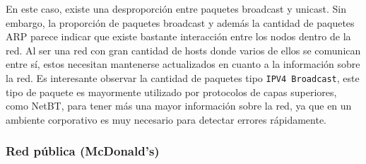 En este caso, existe una desproporción entre paquetes broadcast y unicast. Sin embargo, la proporción de paquetes broadcast y además la cantidad de paquetes ARP parece indicar que existe bastante interacción entre los nodos dentro de la red. Al ser una red con gran cantidad de hosts donde varios de ellos se comunican entre sí, estos necesitan mantenerse actualizados en cuanto a la información sobre la red. Es interesante observar la cantidad de paquetes tipo \texttt{IPV4 Broadcast}, este tipo de paquete es mayormente utilizado por protocolos de capas superiores, como NetBT, para tener más una mayor información sobre la red, ya que en un ambiente corporativo es muy necesario para detectar errores rápidamente.

\subsubsection{Red pública (McDonald's)}

